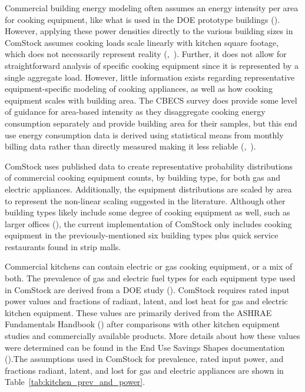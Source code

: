 

Commercial building energy modeling often assumes an energy intensity per area for cooking equipment, like what is used in the DOE prototype buildings (\cite{qsr_50pct_svs}). However, applying these power densities directly to the various building sizes in ComStock assumes cooking loads scale linearly with kitchen square footage, which does not necessarily represent reality (\cite{eia2012cbecs},~\cite{qsr_50pct_svs}). Further, it does not allow for straightforward analysis of specific cooking equipment since it is represented by a single aggregate load. However, little information exists regarding representative equipment-specific modeling of cooking appliances, as well as how cooking equipment scales with building area. The CBECS survey does provide some level of guidance for area-based intensity as they disaggregate cooking energy consumption separately and provide building area for their samples, but this end use energy consumption data is derived using statistical means from monthly billing data rather than directly measured making it less reliable (\cite{eia2012cbecs},~\cite{qsr_50pct_svs}).


ComStock uses published data to create representative probability distributions of commercial cooking equipment counts, by building type, for both gas and electric appliances. Additionally, the equipment distributions are scaled by area to represent the non-linear scaling suggested in the literature. Although other building types likely include some degree of cooking equipment as well, such as larger offices (\cite{eia2012cbecs}), the current implementation of ComStock only includes cooking equipment in the previously-mentioned six building types plus quick service restaurants found in strip malls. 

Commercial kitchens can contain electric or gas cooking equipment, or a mix of both. The prevalence of gas and electric fuel types for each equipment type used in ComStock are derived from a DOE study (\cite{goetzler_commercial_appliances}). ComStock requires rated input power values and fractions of radiant, latent, and lost heat for gas and electric kitchen equipment. These values are primarily derived from the ASHRAE Fundamentals Handbook (\cite{ashrae2017}) after comparisons with other kitchen equipment studies and commercially available products. More details about how these values were determined can be found in the End Use Savings Shapes documentation (\cite{nrel89130}).The assumptions used in ComStock for prevalence, rated input power, and fractions radiant, latent, and lost for gas and electric appliances are shown in Table~\ref{tab:kitchen_prev_and_power}. 

